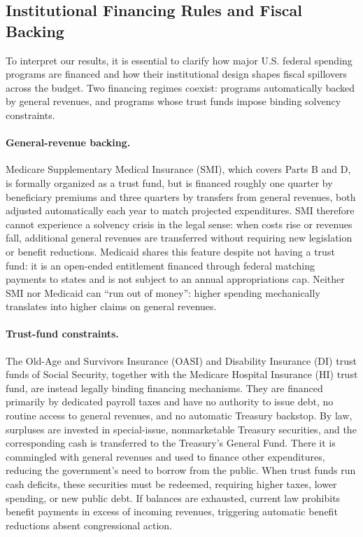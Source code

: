 \documentclass[12pt]{article}%
\theoremstyle{remark}
\begin{document}
\subsection{Institutional Financing Rules and Fiscal Backing}\label{sec:financing} 

To interpret our results, it is essential to clarify how major U.S. federal spending programs are financed and how their institutional design shapes fiscal spillovers across the budget. Two financing regimes coexist: programs automatically backed by general revenues, and programs whose trust funds impose binding solvency constraints.
\paragraph{General-revenue backing.} Medicare Supplementary Medical Insurance (SMI), which covers Parts B and D, is formally organized as a trust fund, but is financed roughly one quarter by beneficiary premiums and three quarters by transfers from general revenues, both adjusted automatically each year to match projected expenditures. SMI therefore cannot experience a solvency crisis in the legal sense: when costs rise or revenues fall, additional general revenues are transferred without requiring new legislation or benefit reductions. Medicaid shares this feature despite not having a trust fund: it is an open-ended entitlement financed through federal matching payments to states and is not subject to an annual appropriations cap. Neither SMI nor Medicaid can “run out of money”: higher spending mechanically translates into higher claims on general revenues.
\paragraph{Trust-fund constraints.} The Old-Age and Survivors Insurance (OASI) and Disability Insurance (DI) trust funds of Social Security, together with the Medicare Hospital Insurance (HI) trust fund, are instead legally binding financing mechanisms. They are financed primarily by dedicated payroll taxes and have no authority to issue debt, no routine access to general revenues, and no automatic Treasury backstop. By law, surpluses are invested in special-issue, nonmarketable Treasury securities, and the corresponding cash is transferred to the Treasury’s General Fund. There it is commingled with general revenues and used to finance other expenditures, reducing the government’s need to borrow from the public. When trust funds run cash deficits, these securities must be redeemed, requiring higher taxes, lower spending, or new public debt. If balances are exhausted, current law prohibits benefit payments in excess of incoming revenues, triggering automatic benefit reductions absent congressional action.
\end{document}
